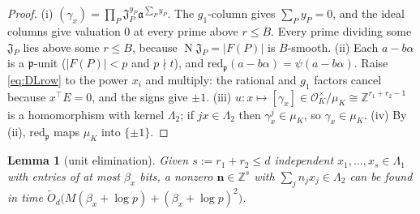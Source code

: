 \documentclass[11pt]{amsart}
\newtheorem{lemma}[theorem]{Lemma}
\theoremstyle{definition}
\newcommand{\Z}{\mathbb{Z}}
\newcommand{\cO}{\mathcal{O}}
\newcommand{\fp}{\mathfrak{p}}
\newcommand{\Norm}{\operatorname{N}}
\begin{document}
\begin{proof}
(i) $(\gamma_x)=\prod_P\mathfrak J_P^{y_P}\mathfrak a^{\sum_Py_P}$. The $g_1$-column gives $\sum_Py_P=0$, and the ideal columns give valuation $0$ at every prime
above $r\le B$. Every prime dividing some $\mathfrak J_P$ lies above some $r\le B$, because $\Norm\mathfrak J_P=|F(P)|$ is $B$-smooth. (ii) Each $a-b\alpha$
is a $\fp$-unit ($|F(P)|<p$ and $p\nmid t$), and $\mathrm{red}_\fp(a-b\alpha)=\psi(a-b\alpha)$. Raise \eqref{eq:DLrow} to the power $x_i$ and multiply: the
rational and $g_1$ factors cancel because $x^\top E=0$, and the signs give $\pm1$. (iii) $u:x\mapsto[\gamma_x]\in\cO_K^\times/\mu_K\cong\Z^{r_1+r_2-1}$ is a
homomorphism with kernel $\Lambda_2$; if $jx\in\Lambda_2$ then $\gamma_x^j\in\mu_K$, so $\gamma_x\in\mu_K$. (iv) By (ii), $\mathrm{red}_\fp$ maps $\mu_K$ into $\{\pm1\}$.
\end{proof}

\begin{lemma}[unit elimination]\label{lem:XK4}
Given $s:=r_1+r_2\le d$ independent $x_1,\dots,x_s\in\Lambda_1$ with entries of at most $\beta_x$ bits, a nonzero $\mathbf n\in\Z^s$ with
$\sum_jn_jx_j\in\Lambda_2$ can be found in time $\tilde O_d\bigl(M(\beta_x+\log p)+(\beta_x+\log p)^2\bigr)$.
\end{lemma}
\end{document}
